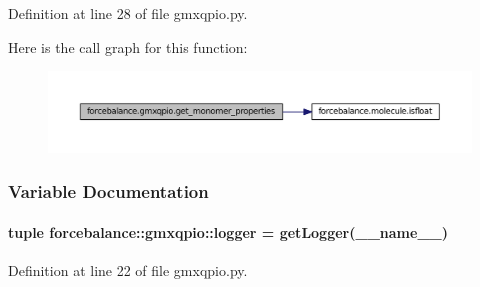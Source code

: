 \-Definition at line 28 of file gmxqpio.\-py.



\-Here is the call graph for this function\-:\nopagebreak
\begin{figure}[H]
\begin{center}
\leavevmode
\includegraphics[width=350pt]{namespaceforcebalance_1_1gmxqpio_a499ed366638eae7be524b18760a986b8_cgraph}
\end{center}
\end{figure}




\subsubsection{\-Variable \-Documentation}
\hypertarget{namespaceforcebalance_1_1gmxqpio_acda091f5560133153442032d0f732f52}{
\paragraph[{logger}]{\setlength{\rightskip}{0pt plus 5cm}tuple {\bf forcebalance\-::gmxqpio\-::logger} = get\-Logger(\-\_\-\-\_\-name\-\_\-\-\_\-)}}\label{namespaceforcebalance_1_1gmxqpio_acda091f5560133153442032d0f732f52}


\-Definition at line 22 of file gmxqpio.\-py.

